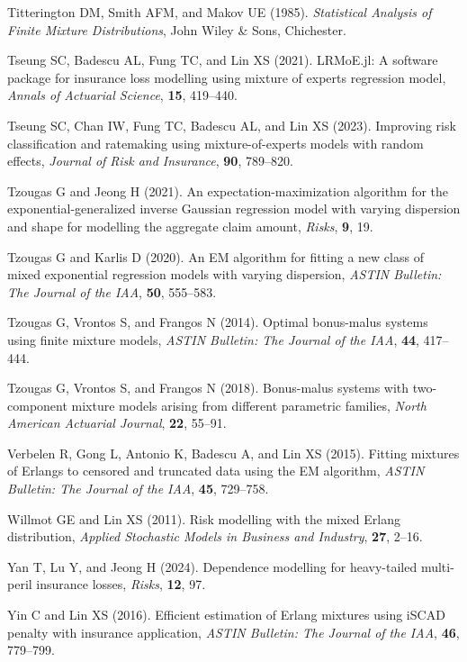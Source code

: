 \documentclass[eng]{csam}
\begin{document}
\begin{reference}
Titterington DM, Smith AFM, and Makov UE (1985). {\em Statistical Analysis of Finite Mixture Distributions}, John Wiley \& Sons, Chichester.

Tseung SC, Badescu AL, Fung TC, and Lin XS (2021). LRMoE.jl: A software package for insurance loss modelling using mixture of experts regression model, {\em Annals of Actuarial Science}, {\bf 15}, 419--440.

Tseung SC, Chan IW, Fung TC, Badescu AL, and Lin XS (2023). Improving risk classification and ratemaking using mixture-of-experts models with random effects, {\em Journal of Risk and Insurance}, {\bf 90}, 789--820.

Tzougas G and Jeong H (2021). An expectation-maximization algorithm for the exponential-generalized inverse Gaussian regression model with varying dispersion and shape for modelling the aggregate claim amount, {\em Risks}, {\bf 9}, 19.

Tzougas G and Karlis D (2020). An EM algorithm for fitting a new class of mixed exponential regression models with varying dispersion, {\em ASTIN Bulletin: The Journal of the IAA}, {\bf 50}, 555--583.

Tzougas G, Vrontos S, and Frangos N (2014). Optimal bonus-malus systems using finite mixture models, {\em ASTIN Bulletin: The Journal of the IAA}, {\bf 44}, 417--444.

Tzougas G, Vrontos S, and Frangos N (2018). Bonus-malus systems with two-component mixture models arising from different parametric families, {\em North American Actuarial Journal}, {\bf 22}, 55--91.

Verbelen R, Gong L, Antonio K, Badescu A, and Lin XS (2015). Fitting mixtures of Erlangs to censored and truncated data using the EM algorithm, {\em ASTIN Bulletin: The Journal of the IAA}, {\bf 45}, 729--758.

Willmot GE and Lin XS (2011). Risk modelling with the mixed Erlang distribution, {\em Applied Stochastic Models in Business and Industry}, {\bf 27}, 2--16.

Yan T, Lu Y, and Jeong H (2024). Dependence modelling for heavy-tailed multi-peril insurance losses, {\em Risks}, {\bf 12}, 97.

Yin C and Lin XS (2016). Efficient estimation of Erlang mixtures using iSCAD penalty with insurance application, {\em ASTIN Bulletin: The Journal of the IAA}, {\bf 46}, 779--799.
\end{reference}
\end{document}
